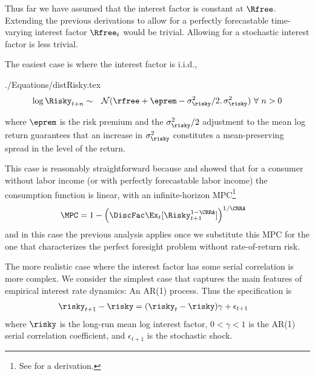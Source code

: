 \documentclass[titlepage, headings=optiontotocandhead]{\econtex}
\begin{document}
Thus far we have assumed that the interest factor is constant at $\Rfree$.  Extending the
previous derivations to allow for a perfectly forecastable time-varying interest factor $\Rfree_{t}$ 
would be trivial.  Allowing for a stochastic interest factor is less trivial.  


The easiest case is where the interest factor is i.i.d.,
\begin{verbatimwrite}{./Equations/distRisky.tex}
  \begin{equation}\begin{gathered}\begin{aligned}
        \log \Risky_{t+n} & \sim & \mathcal{N}(\rfree + \eprem - \sigma^{2}_{\risky}/2,\sigma^{2}_{\risky}) ~\forall~n>0 \label{eq:distRisky}
      \end{aligned}\end{gathered}\end{equation}
\end{verbatimwrite}
\unskip
where $\eprem$ is the risk premium and the $\sigma^{2}_{\risky}/2$ adjustment to the mean log return
guarantees that an increase in $\sigma^{2}_{\risky}$ constitutes a mean-preserving spread in the level of the return.  

This case is reasonably straightforward because \cite{merton:restat} and \cite{samuelson:portfolio} showed
that for a consumer without labor income (or with perfectly forecastable labor income) the consumption
function is linear, with an infinite-horizon MPC\footnote{See  for a derivation.}
\begin{equation}\begin{gathered}\begin{aligned}
      \MPC  & = 1- \left(\DiscFac  \Ex_{t}[\Risky_{t+1}^{1-\CRRA}]\right)^{1/\CRRA} \label{eq:MPCExact}
    \end{aligned}\end{gathered}\end{equation}
and in this case the previous analysis applies once we substitute this MPC for the one that characterizes 
the perfect foresight problem without rate-of-return risk.  

The more realistic case where the interest factor has some serial correlation is more complex.  We consider 
the simplest case that captures the main features of empirical interest rate dynamics: An AR(1) process.  Thus
the specification is 
\begin{equation}\begin{gathered}\begin{aligned}
      \risky_{t+1}-\risky  & = (\risky_{t}-\risky) \gamma + \epsilon_{t+1} 
    \end{aligned}\end{gathered}\end{equation}
where $\risky$ is the long-run mean log interest factor, $0 < \gamma < 1$ is the AR(1) serial correlation
coefficient, and $\epsilon_{t+1}$ is the stochastic shock.  
\end{document}

